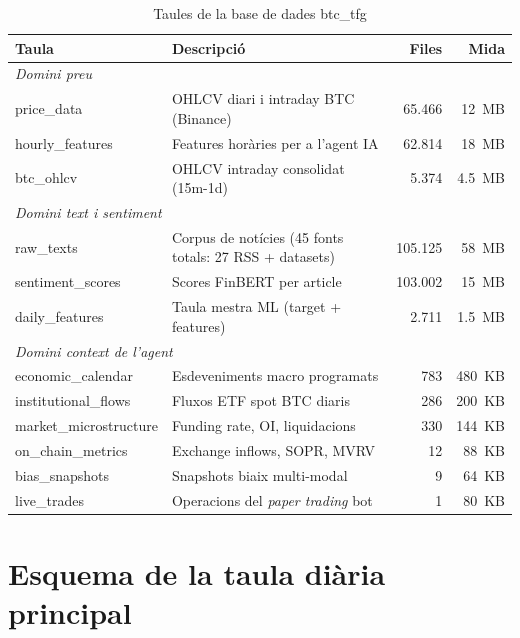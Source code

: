 \documentclass[12pt, a4paper]{report}
\begin{document}
\begin{table}[H]
\centering
\caption{Taules de la base de dades btc\_tfg}
\label{tab:bd}
\begin{tabular}{@{}llrr@{}}
\toprule
\textbf{Taula} & \textbf{Descripció} & \textbf{Files} & \textbf{Mida} \\
\midrule
\multicolumn{4}{l}{\textit{Domini preu}} \\
price\_data           & OHLCV diari i intraday BTC (Binance)    & 65.466  & 12~MB \\
hourly\_features      & Features horàries per a l'agent IA      & 62.814  & 18~MB \\
btc\_ohlcv            & OHLCV intraday consolidat (15m-1d)      &  5.374  & 4.5~MB \\
\midrule
\multicolumn{4}{l}{\textit{Domini text i sentiment}} \\
raw\_texts            & Corpus de notícies (45 fonts totals: 27 RSS + datasets)           & 105.125 & 58~MB \\
sentiment\_scores     & Scores FinBERT per article              & 103.002 & 15~MB \\
daily\_features       & Taula mestra ML (target + features)     &   2.711 & 1.5~MB \\
\midrule
\multicolumn{4}{l}{\textit{Domini context de l'agent}} \\
economic\_calendar    & Esdeveniments macro programats          &     783 & 480~KB \\
institutional\_flows  & Fluxos ETF spot BTC diaris              &     286 & 200~KB \\
market\_microstructure& Funding rate, OI, liquidacions          &     330 & 144~KB \\
on\_chain\_metrics    & Exchange inflows, SOPR, MVRV            &      12 & 88~KB \\
bias\_snapshots       & Snapshots biaix multi-modal             &       9 & 64~KB \\
live\_trades          & Operacions del \textit{paper trading} bot &      1 & 80~KB \\
\bottomrule
\end{tabular}
\end{table}

\vspace{8cm}
\section{Esquema de la taula diària principal}
\end{document}
